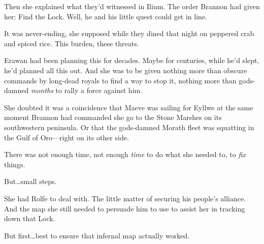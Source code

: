 Then she explained what they'd witnessed in Ilium.
The order Brannon had given her: Find the Lock.
Well, he and his little quest could get in line.

It was never-ending, she supposed while they dined that night on peppered crab and spiced rice.
This burden, these threats.

Erawan had been planning this for decades.
Maybe for centuries, while he'd slept, he'd planned all this out.
And she was to be given nothing more than obscure commands by long-dead royals to find a way to stop it, nothing more than gods-damned \emph{months} to rally a force against him.

She doubted it was a coincidence that Maeve was sailing for Eyllwe at the same moment Brannon had commanded she go to the Stone Marshes on its southwestern peninsula.
Or that the gods-damned Morath fleet was squatting in the Gulf of Oro---right on its other side.

There was not enough time, not enough \emph{time} to do what she needed to, to \emph{fix} things.

But\ldots small steps.

She had Rolfe to deal with.
The little matter of securing his people's alliance.
And the map she still needed to persuade him to use to assist her in tracking down that Lock.

But first\ldots best to ensure that infernal map actually worked.
